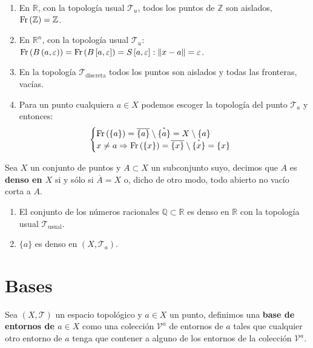 \begin{ej}
\begin{enumerate}
    \item En $\mathbb{R}$, con la topología usual $\mathcal{T}_u$, todos los puntos de $\mathbb{Z}$ son aislados, $\operatorname{Fr}\left( \mathbb{Z} \right) = \mathbb{Z}$.
    \item En $\mathbb{R}^n$, con la topología usual $\mathcal{T}_u$: $\operatorname{Fr}\left( B\left( a, \varepsilon \right) \right) = \operatorname{Fr}\left( B\left[ a, \varepsilon \right] \right) = S\left[ a, \varepsilon \right] : \lVert x - a \rVert = \varepsilon$.
    \item En la topología $\mathcal{T}_{\text{discreta}}$ todos los puntos son aislados y todas las fronteras, vacías.
    \item Para un punto cualquiera $a \in X$ podemos escoger la topología del punto $\mathcal{T}_a$ y entonces:
$$
\begin{cases}
	\operatorname{Fr}\left( \{a\} \right) = \overline{\{a\}} \setminus \mathring{\{a\}} = X \setminus \{a\} \\
    x \neq a \Rightarrow \operatorname{Fr}\left( \{x\} \right) = \overline{\{x\}} \setminus \mathring{\{x\}} = \{x\} 
\end{cases} 
$$
\end{enumerate}
\end{ej}

\begin{defi}[Densidad]
Sea $X$ un conjunto de puntos y $A \subset X$ un subconjunto suyo, decimos que $A$ es \textbf{denso en $X$} si y sólo si $\overline{A} = X$ o, dicho de otro modo, todo abierto no vacío corta a $A$.
\end{defi}

\begin{ej}
\begin{enumerate}
    \item El conjunto de los números racionales $\mathbb{Q} \subset \mathbb{R}$ es denso en $\mathbb{R}$ con la topología usual $\mathcal{T}_{\text{usual}}$.
    \item $\{a\}$ es denso en $\left( X, \mathcal{T}_a \right)$.
\end{enumerate}
\end{ej}

\section{Bases}%
\label{sec:bases}
\begin{defi}
Sea $(X, \mathcal{T})$ un espacio topológico y $a\in X$ un punto, definimos una \textbf{base de entornos de $a \in X$} como una colección $\mathcal{V}^a$ de entornos de $a$ tales que cualquier otro entorno de $a$ tenga que contener a alguno de los entornos de la colección $\mathcal{V}^a$.
\end{defi}

